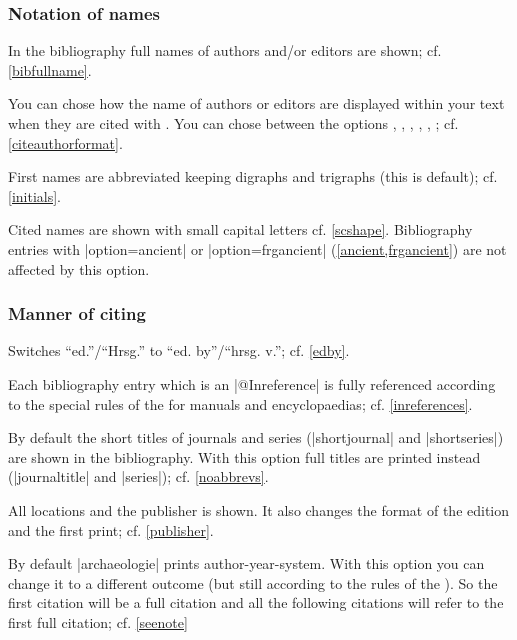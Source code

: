 \documentclass[a4paper,
10pt,
greek,
french,
spanish,
italian,
ngerman,
english,
]{ltxdoc}
\begin{document}
\subsubsection{Notation of names}
In the bibliography full names of authors and/or editors are shown; cf. \cref{bibfullname}.

You can chose how the name of authors or editors are displayed within your text when they are cited with .
You can chose between the options 
, 
, 
, 
,
,
; 
cf. \cref{citeauthorformat}.



First names are abbreviated keeping digraphs and trigraphs (this is default); cf. \cref{initials}.

Cited names are shown with small capital letters cf. \cref{scshape}.
Bibliography entries with |option={ancient}| or |option={frgancient}| (\cref{ancient,frgancient}) are not affected by this option.

\subsubsection{Manner of citing}

Switches \enquote{ed.}/\enquote{Hrsg.} to \enquote{ed. by}/\enquote{hrsg. v.}; cf. \cref{edby}.

Each bibliography entry which is an |@Inreference| is fully referenced according to the special rules of the 
\DAI for manuals and encyclopaedias; cf. \cref{inreferences}.

By default the short titles of journals and series (|shortjournal| and |shortseries|) are shown in the bibliography.
With this option full titles are printed instead (|journaltitle| and |series|); cf. \cref{noabbrevs}.

All locations and the publisher is shown. 
It also changes the format of the edition and the first print; cf. \cref{publisher}.

By default |archaeologie| prints author-year-system. 
With this option you can change it to a different outcome (but still according to the rules of the \DAI). 
So the first citation will be a full citation and all the following citations will refer to the first full citation; cf. \cref{seenote}
\end{document}
